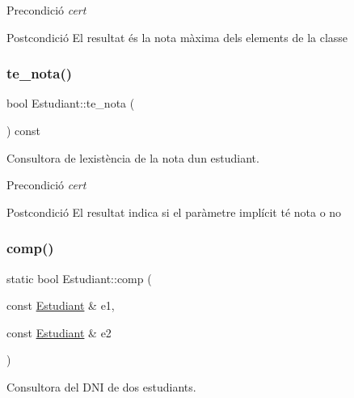 \begin{DoxyPrecond}{Precondició}
{\itshape cert} 
\end{DoxyPrecond}
\begin{DoxyPostcond}{Postcondició}
El resultat és la nota màxima dels elements de la classe 
\end{DoxyPostcond}
\mbox{\label{class_estudiant_a81f265e635e1fe198867a5b594359e1b}} 
\subsubsection{\texorpdfstring{te\+\_\+nota()}{te\_nota()}}
{\footnotesize\ttfamily bool Estudiant\+::te\+\_\+nota (\begin{DoxyParamCaption}{ }\end{DoxyParamCaption}) const}



Consultora de l\textquotesingle{}existència de la nota d\textquotesingle{}un estudiant. 

\begin{DoxyPrecond}{Precondició}
{\itshape cert} 
\end{DoxyPrecond}
\begin{DoxyPostcond}{Postcondició}
El resultat indica si el paràmetre implícit té nota o no 
\end{DoxyPostcond}
\mbox{\label{class_estudiant_a5f19b7f7436e8c12a13159335040ae42}} 
\subsubsection{\texorpdfstring{comp()}{comp()}}
{\footnotesize\ttfamily static bool Estudiant\+::comp (\begin{DoxyParamCaption}\item[{const \hyperlink{class_estudiant}{Estudiant} \&}]{e1,  }\item[{const \hyperlink{class_estudiant}{Estudiant} \&}]{e2 }\end{DoxyParamCaption})\hspace{0.3cm}{\ttfamily [static]}}



Consultora del D\+NI de dos estudiants. 

